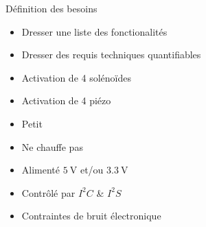 \begin{frame}{Définition des besoins}
    \begin{twocolumns}
        \leftcol
        \begin{itemize}
            \item     Dresser une liste des fonctionalités
            \item<2-> Dresser des requis techniques quantifiables
            \bigskip
        \end{itemize}

        \rightcol
        \begin{itemize}
            \item Activation de 4 solénoïdes
            \item Activation de 4 piézo
            \item Petit
            \item Ne chauffe pas
            \item Alimenté $\SI{5}{\volt}$ et/ou $\SI{3.3}{\volt}$
            \item Contrôlé par ${I^2}C$ \& ${I^2}S$
            \item Contraintes de bruit électronique
        \end{itemize}
    \end{twocolumns}
\end{frame}

